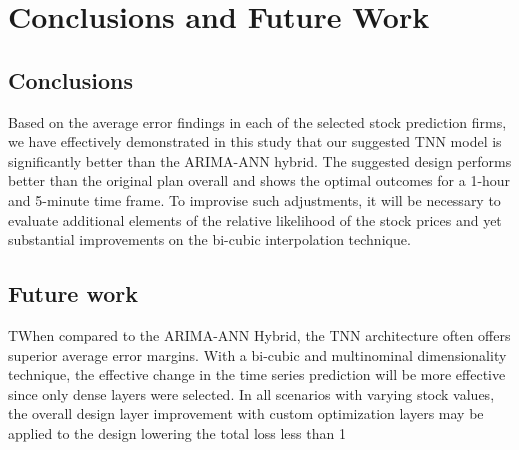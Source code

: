 \chapter{Conclusions and Future Work}
\label{ch:con}
\section{Conclusions}
Based on the average error findings in each of the selected stock prediction firms, we have effectively demonstrated in this study that our suggested TNN model is significantly better than the ARIMA-ANN hybrid. The suggested design performs better than the original plan overall and shows the optimal outcomes for a 1-hour and 5-minute time frame. To improvise such adjustments, it will be necessary to evaluate additional elements of the relative likelihood of the stock prices and yet substantial improvements on the bi-cubic interpolation technique.


\section{Future work}
TWhen compared to the ARIMA-ANN Hybrid, the TNN architecture often offers superior average error margins. With a bi-cubic and multinominal dimensionality technique, the effective change in the time series prediction will be more effective since only dense layers were selected. In all scenarios with varying stock values, the overall design layer improvement with custom optimization layers may be applied to the design lowering the total loss less than 1%
